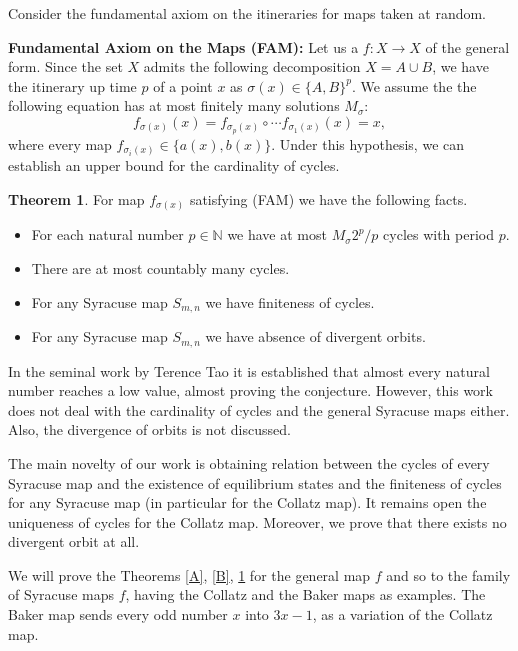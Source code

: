 \documentclass[12 pt]{amsart}
\theoremstyle{definition}
\newtheorem{theorema}{Theorem}
\begin{document}
	Consider the fundamental axiom on the itineraries for maps taken at random.
	
	\textbf{Fundamental Axiom on the Maps (FAM):} Let us a $f: X \to X$ of the general form. Since the set $X$ admits the following decomposition $X = A \cup B$, we have the itinerary up time $p$ of a point $x$ as $\sigma(x) \in \{A, B\}^{p}$. We assume the the following equation has at most finitely many solutions $M_{\sigma}$:
	\[
	f_{\sigma(x)} (x) = f_{\sigma_{p}(x)} \circ \cdots f_{\sigma_{1}(x)} (x) = x,
	\]
	where every map $f_{\sigma_{i}(x)} \in \{a(x), b(x)\}$. Under this hypothesis, we can establish an upper bound for the cardinality of cycles.	

	\begin{theorema}\label{C}
		For map $f_{\sigma(x)}$ satisfying (FAM) we have the following facts.
		\begin{itemize}		
			\item For each natural number $p \in \mathbb{N}$ we have at most $M_{\sigma} 2^{p}/p$ cycles with period $p$.
			
			\item There are at most countably many cycles.
			
			\item For any Syracuse map $S_{m,n}$ we have finiteness of cycles.
			
			\item For any Syracuse map $S_{m,n}$ we have absence of divergent orbits.
			
		\end{itemize}
	\end{theorema}
	
	In the seminal work by Terence Tao \cite{Tao2022} it is established that almost every natural number reaches a low value, almost proving the conjecture. However, this work does not deal with the cardinality of cycles and the general Syracuse maps either. Also, the divergence of orbits is not discussed.
	
	The main novelty of our work is obtaining relation between the cycles of every Syracuse map and the existence of equilibrium states and the finiteness of cycles for any Syracuse map (in particular for the Collatz map). It remains open the uniqueness of cycles for the Collatz map. Moreover, we prove that there exists no divergent orbit at all.
	
	We will prove the Theorems \ref{A}, \ref{B}, \ref{C} for the general map $f$ and so to the family of Syracuse maps $f$, having the Collatz and the Baker maps as examples. The Baker map sends every odd number $x$ into $3x - 1$, as a variation of the Collatz map.
\end{document}
